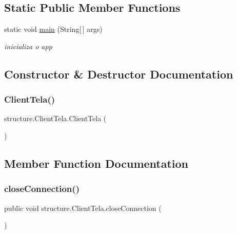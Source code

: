 \subsection*{Static Public Member Functions}
\begin{DoxyCompactItemize}
\item 
static void \hyperlink{classstructure_1_1_client_tela_ab70271ebd978b7bf287b1f18d4febae7}{main} (String\mbox{[}$\,$\mbox{]} args)
\begin{DoxyCompactList}\small\item\em inicializa o app \end{DoxyCompactList}\end{DoxyCompactItemize}


\subsection{Constructor \& Destructor Documentation}
\mbox{\label{classstructure_1_1_client_tela_a0f805fc16d6609f1063575f445ee5a56}} 
\subsubsection{\texorpdfstring{Client\+Tela()}{ClientTela()}}
{\footnotesize\ttfamily structure.\+Client\+Tela.\+Client\+Tela (\begin{DoxyParamCaption}{ }\end{DoxyParamCaption})}



\subsection{Member Function Documentation}
\mbox{\label{classstructure_1_1_client_tela_a7b9558eff45ebd37710065d2607329fb}} 
\subsubsection{\texorpdfstring{close\+Connection()}{closeConnection()}}
{\footnotesize\ttfamily public void structure.\+Client\+Tela.\+close\+Connection (\begin{DoxyParamCaption}{ }\end{DoxyParamCaption})}



